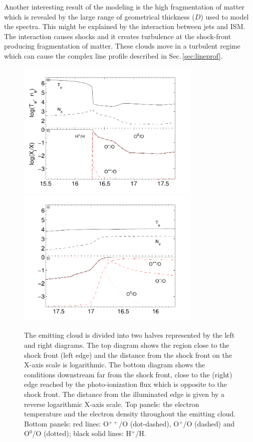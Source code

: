 \documentclass[../main.tex]{subfiles}
\begin{document}
Another interesting result of the modeling is the high fragmentation of matter which is revealed by the large range of geometrical thickness ($D$) used to model the spectra.
This might be explained by the interaction between jets and ISM.
The interaction causes shocks and it creates turbulence at the shock-front producing fragmentation of matter.
These clouds move in a turbulent regime which can cause the complex line profile described in Sec.\,\ref{sec:lineprof}. 

\begin{figure}
\centering
\includegraphics[width=8.8cm]{images/paper1/bin4l.pdf}
\includegraphics[width=8.8cm]{images/paper1/bin4r.pdf}
\caption{The emitting cloud is divided into two halves represented by the left and right  diagrams.  
The top diagram shows the region close to the shock front (left edge) and the distance from the shock front on the X-axis scale is logarithmic.
The bottom diagram shows the conditions downstream far from the shock front, close to the (right) edge reached by the photo-ionization flux which is opposite to the shock front.  
The distance from the illuminated edge is given by a reverse logarithmic X-axis scale.
Top panels: the electron temperature and  the electron density throughout the emitting cloud.
Bottom panels: red lines: O$^{++}$/O (dot-dashed),  O$^+$/O (dashed) and O$^0$/O (dotted); black solid lines: H$^+$/H. 
}
\label{fig:sumamod}
\end{figure}
\end{document}
